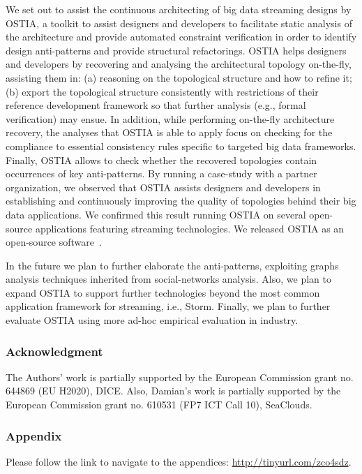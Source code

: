 We set out to assist the continuous architecting of big data streaming designs by OSTIA, a toolkit to assist designers and developers to facilitate static analysis of the architecture and provide automated constraint verification in order to identify design anti-patterns and provide structural refactorings. OSTIA helps designers and developers by recovering and analysing the architectural topology on-the-fly, assisting them in: (a) reasoning on the topological structure and how to refine it; (b) export the topological structure consistently with restrictions of their reference development framework so that further analysis (e.g., formal verification) may ensue. In addition, while performing on-the-fly architecture recovery, the analyses that OSTIA is able to apply focus on checking for the compliance to essential consistency rules specific to targeted big data frameworks. Finally, OSTIA allows to check whether the recovered topologies contain occurrences of key anti-patterns. By running a case-study with a partner organization, we observed that OSTIA assists designers and developers in establishing and continuously improving the quality of topologies behind their big data applications. We confirmed this result running OSTIA on several open-source applications featuring streaming technologies. We released OSTIA as an open-source software~\cite{ostia}. %
 
In the future we plan to further elaborate the anti-patterns, 
exploiting graphs analysis techniques inherited from social-networks analysis. Also, we plan to expand OSTIA to support further technologies beyond the most common application framework for streaming, i.e., Storm. Finally, we plan to further evaluate OSTIA using more ad-hoc empirical evaluation in industry.

{\small\subsubsection*{Acknowledgment} The Authors' work is partially supported by the European Commission grant no. 644869 (EU H2020), DICE. Also, Damian's work is partially supported by the European Commission grant no. 610531 (FP7 ICT Call 10), SeaClouds.}

{\small\subsubsection*{Appendix} Please follow the link to navigate to the appendices: \url{http://tinyurl.com/zco4sdz}.}